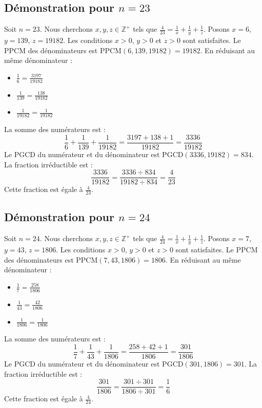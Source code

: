 \documentclass[11pt,a4paper]{article}
\begin{document}
\subsection{Démonstration pour $n = 23$}
Soit $n = 23$. Nous cherchons $x, y, z \in \mathbb{Z}^{+}$ tels que $\frac{4}{23} = \frac{1}{x} + \frac{1}{y} + \frac{1}{z}$.
Posons $x = 6$, $y = 139$, $z = 19182$.
Les conditions $x > 0$, $y > 0$ et $z > 0$ sont satisfaites.
Le PPCM des dénominateurs est $\text{PPCM}(6, 139, 19182) = 19182$.
En réduisant au même dénominateur :
\begin{itemize}
    \item $\frac{1}{6} = \frac{3197}{19182}$
    \item $\frac{1}{139} = \frac{138}{19182}$
    \item $\frac{1}{19182} = \frac{1}{19182}$
\end{itemize}
La somme des numérateurs est :
$$ \frac{1}{6} + \frac{1}{139} + \frac{1}{19182} = \frac{3197 + 138 + 1}{19182} = \frac{3336}{19182} $$
Le PGCD du numérateur et du dénominateur est $\text{PGCD}(3336, 19182) = 834$.
La fraction irréductible est :
$$ \frac{3336}{19182} = \frac{3336 \div 834}{19182 \div 834} = \frac{4}{23} $$
Cette fraction est égale à $\frac{4}{23}$.

\subsection{Démonstration pour $n = 24$}
Soit $n = 24$. Nous cherchons $x, y, z \in \mathbb{Z}^{+}$ tels que $\frac{4}{24} = \frac{1}{x} + \frac{1}{y} + \frac{1}{z}$.
Posons $x = 7$, $y = 43$, $z = 1806$.
Les conditions $x > 0$, $y > 0$ et $z > 0$ sont satisfaites.
Le PPCM des dénominateurs est $\text{PPCM}(7, 43, 1806) = 1806$.
En réduisant au même dénominateur :
\begin{itemize}
    \item $\frac{1}{7} = \frac{258}{1806}$
    \item $\frac{1}{43} = \frac{42}{1806}$
    \item $\frac{1}{1806} = \frac{1}{1806}$
\end{itemize}
La somme des numérateurs est :
$$ \frac{1}{7} + \frac{1}{43} + \frac{1}{1806} = \frac{258 + 42 + 1}{1806} = \frac{301}{1806} $$
Le PGCD du numérateur et du dénominateur est $\text{PGCD}(301, 1806) = 301$.
La fraction irréductible est :
$$ \frac{301}{1806} = \frac{301 \div 301}{1806 \div 301} = \frac{1}{6} $$
Cette fraction est égale à $\frac{4}{24}$.
\end{document}
